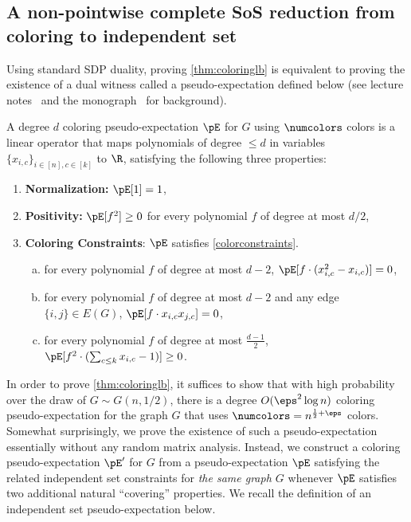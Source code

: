 \subsection{A non-pointwise complete SoS reduction from coloring to independent set} 
Using standard SDP duality, proving \cref{thm:coloringlb} is equivalent to proving the existence of a dual witness called a pseudo-expectation defined below (see lecture notes~\cite{BarakS16} and the monograph~\cite{TCS-086} for background). 

\begin{definition}
A degree $d$ coloring pseudo-expectation $\pE$ for $G$ using $\numcolors$ colors is a linear operator that maps polynomials of degree $\leq d$ in variables $\{x_{i,c}\}_{ i \in [n], c \in [k]}$ to $\R$, satisfying the following three properties:
\begin{enumerate}
	\item \textbf{Normalization: } $\pE[1]  = 1$,
	\item \textbf{Positivity: } $\pE[f^2] \geq 0$ for every polynomial $f$ of degree at most $d/2$,
	\item \textbf{Coloring Constraints}: $\pE$ satisfies \cref{colorconstraints}. \begin{enumerate}[(a)] 
	\item for every polynomial $f$ of degree at most $d-2$, $\pE[f \cdot (x_{i,c}^2 - x_{i,c})] = 0$,
	\item for every polynomial $f$ of degree at most $d-2$ and any edge $\{i, j\} \in E(G)$, $\pE[f \cdot x_{i,c} x_{j,c}] = 0$,
	 \item for every polynomial $f$ of degree at most $\frac{d-1}{2}$, $\pE[f^2 \cdot (\sum_{c \leq k} x_{i,c} -1)] \geq 0$. 
	\end{enumerate}
	\end{enumerate}
\end{definition}
In order to prove \cref{thm:coloringlb}, it suffices to show that with high probability over the draw of $G \sim G(n,1/2)$, there is a degree $O(\eps^2 \log n)$ coloring pseudo-expectation for the graph $G$ that uses $\numcolors = n^{\frac{1}{2}+ \eps}$ colors. Somewhat surprisingly, we prove the existence of such a pseudo-expectation essentially without any random matrix analysis. Instead, we construct a coloring pseudo-expectation $\pE'$ for $G$ from a pseudo-expectation $\pE$ satisfying the related independent set constraints for \emph{the same graph $G$} whenever $\pE$ satisfies two additional natural ``covering'' properties. We recall the definition of an independent set pseudo-expectation below.

